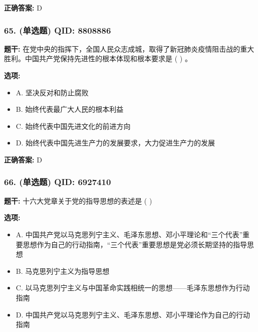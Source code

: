 \documentclass[12pt,UTF8]{ctexart}
\begin{document}
\textbf{正确答案:}
D

\vspace{0.3em}\hrulefill\vspace{0.7em}

\subsubsection*{65. (单选题) \small QID: 8808886}

\textbf{题干:}
在党中央的指挥下，全国人民众志成城，取得了新冠肺炎疫情阻击战的重大胜利。中国共产党保持先进性的根本体现和根本要求是 ( ) 。

\textbf{选项:}
\begin{itemize}[leftmargin=*]

  \item A. 坚决反对和防止腐败

  \item B. 始终代表最广大人民的根本利益

  \item C. 始终代表中国先进文化的前进方向

  \item D. 始终代表中国先进生产力的发展要求，大力促进生产力的发展

\end{itemize}

\textbf{正确答案:}
D

\vspace{0.3em}\hrulefill\vspace{0.7em}

\subsubsection*{66. (单选题) \small QID: 6927410}

\textbf{题干:}
十六大党章关于党的指导思想的表述是 ( )

\textbf{选项:}
\begin{itemize}[leftmargin=*]

  \item A. 中国共产党以马克思列宁主义、毛泽东思想、邓小平理论和“三个代表”重要思想作为自己的行动指南，“三个代表”重要思想是党必须长期坚持的指导思想

  \item B. 马克思列宁主义为指导思想

  \item C. 以马克思列宁主义与中国革命实践相统一的思想——毛泽东思想作为行动指南

  \item D. 中国共产党以马克思列宁主义、毛泽东思想、邓小平理论作为自己的行动指南

\end{itemize}
\end{document}
